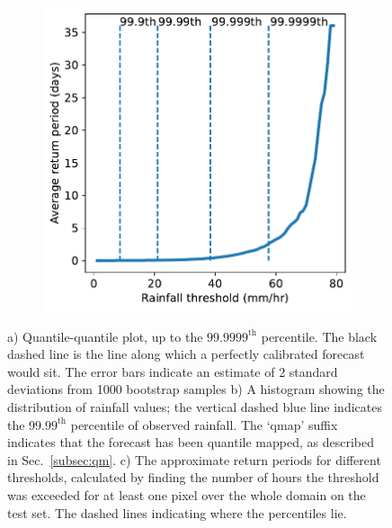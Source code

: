 \documentclass{article}
\begin{document}
\begin{figure}[!ht]
\begin{subfigure}[h]{0.5\textwidth}
         \caption{}
        \centering
    \end{subfigure}
    \begin{subfigure}{0.48\textwidth}
     \includegraphics[width=\textwidth]{images/return_periods.pdf}
     \caption{}
     \end{subfigure}
     \centering
     \caption{a) Quantile-quantile plot, up to the $99.9999^{\text{th}}$ percentile. The black dashed line is the line along which a perfectly calibrated forecast would sit. The error bars indicate an estimate of 2 standard deviations from 1000 bootstrap samples b) A histogram showing the distribution of rainfall values; the vertical dashed blue line indicates the $99.99^{\text{th}}$ percentile of observed rainfall. The `qmap' suffix indicates that the forecast has been quantile mapped, as described in Sec.~\ref{subsec:qm}. c) The approximate return periods for different thresholds, calculated by finding the number of hours the threshold was exceeded for at least one pixel over the whole domain on the test set. The dashed lines indicating where the percentiles lie. }
     \label{fig:distribution}
\end{figure}
\end{document}

